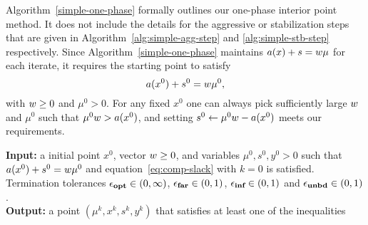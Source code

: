 \documentclass{article}
\begin{document}
Algorithm~\ref{simple-one-phase} formally outlines our one-phase interior point method. It does not include the details for the aggressive or stabilization steps that are given in Algorithm~\ref{alg:simple-agg-step} and \ref{alg:simple-stb-step} respectively. Since Algorithm~\ref{simple-one-phase} maintains $a(x) + s = w \mu$ for each iterate, it requires the starting point to satisfy
$$
a(x^{0}) + s^{0} = w \mu^{0},
$$
with $w \ge 0$ and $\mu^{0} > 0$. For any fixed $x^{0}$ one can always pick sufficiently large $w$ and $\mu^{0}$ such that $\mu^{0} w > a(x^{0})$, and setting $s^{0} \gets  \mu^{0}  w- a(x^{0})$ meets our requirements.

\newcommand{\superlinear}[1]{}

\begin{algorithm}[H]
\textbf{Input:} a initial point $x^{0}$, vector $w \ge 0$, and variables $\mu^0, s^{0}, y^{0} > 0$  such that $a(x^{0}) + s^{0} = w \mu^{0}$ and equation~\eqref{eq:comp-slack} with $k=0$ is satisfied. Termination tolerances $\epsilon_{\textbf{opt}} \in (0,\infty)$, $\epsilon_{\textbf{far}} \in (0,1)$, $\epsilon_{\textbf{inf}} \in (0,1)$ and $\epsilon_{\textbf{unbd}} \in (0,1)$. \\
\textbf{Output:} a point $(\mu^k, x^k, s^k, y^k)$ that satisfies at least one of the inequalities \termination{} \\


\end{algorithm}
\end{document}
